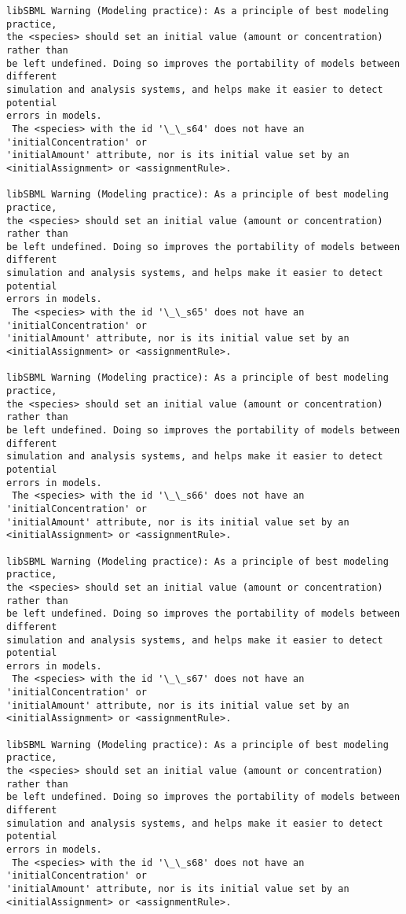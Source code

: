 \documentclass[11pt]{article}
\begin{document}
\begin{Verbatim}[commandchars=\\\{\}]
libSBML Warning (Modeling practice): As a principle of best modeling practice,
the <species> should set an initial value (amount or concentration) rather than
be left undefined. Doing so improves the portability of models between different
simulation and analysis systems, and helps make it easier to detect potential
errors in models.
 The <species> with the id '\_\_s64' does not have an 'initialConcentration' or
'initialAmount' attribute, nor is its initial value set by an
<initialAssignment> or <assignmentRule>.

libSBML Warning (Modeling practice): As a principle of best modeling practice,
the <species> should set an initial value (amount or concentration) rather than
be left undefined. Doing so improves the portability of models between different
simulation and analysis systems, and helps make it easier to detect potential
errors in models.
 The <species> with the id '\_\_s65' does not have an 'initialConcentration' or
'initialAmount' attribute, nor is its initial value set by an
<initialAssignment> or <assignmentRule>.

libSBML Warning (Modeling practice): As a principle of best modeling practice,
the <species> should set an initial value (amount or concentration) rather than
be left undefined. Doing so improves the portability of models between different
simulation and analysis systems, and helps make it easier to detect potential
errors in models.
 The <species> with the id '\_\_s66' does not have an 'initialConcentration' or
'initialAmount' attribute, nor is its initial value set by an
<initialAssignment> or <assignmentRule>.

libSBML Warning (Modeling practice): As a principle of best modeling practice,
the <species> should set an initial value (amount or concentration) rather than
be left undefined. Doing so improves the portability of models between different
simulation and analysis systems, and helps make it easier to detect potential
errors in models.
 The <species> with the id '\_\_s67' does not have an 'initialConcentration' or
'initialAmount' attribute, nor is its initial value set by an
<initialAssignment> or <assignmentRule>.

libSBML Warning (Modeling practice): As a principle of best modeling practice,
the <species> should set an initial value (amount or concentration) rather than
be left undefined. Doing so improves the portability of models between different
simulation and analysis systems, and helps make it easier to detect potential
errors in models.
 The <species> with the id '\_\_s68' does not have an 'initialConcentration' or
'initialAmount' attribute, nor is its initial value set by an
<initialAssignment> or <assignmentRule>.


\end{Verbatim}
\end{document}

